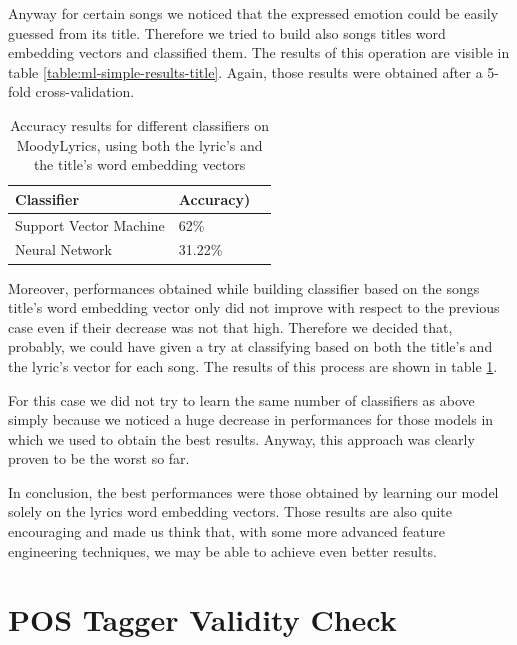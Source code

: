 Anyway for certain songs we noticed that the expressed emotion could be easily guessed from its title. Therefore
we tried to build also songs titles word embedding vectors and classified them. The results of this operation are 
visible in table \ref{table:ml-simple-results-title}. Again, those results were obtained after a 5-fold cross-validation. 

\begin{table}[]
\centering
\begin{tabular}{@{}lll@{}}
\toprule
\textbf{Classifier} & \textbf{Accuracy})   \\ \midrule
Support Vector Machine & 62\%  \\
Neural Network & 31.22\%  \\
\end{tabular}
\caption{Accuracy results for different classifiers on MoodyLyrics, using both the lyric's and the title's word embedding vectors}
\label{table:ml-simple-results-both}
\end{table}

Moreover, performances obtained while building classifier based on the songs title's word embedding vector only
did not improve with respect to the previous case even if their decrease was not that high. Therefore we decided
that, probably, we could have given a try at classifying based on both the title's and the lyric's vector for each
song. The results of this process are shown in table \ref{table:ml-simple-results-both}.

For this case we did not try to learn the same number of classifiers as above simply because we noticed a huge decrease
in performances for those models in which we used to obtain the best results. Anyway, this approach was clearly proven to be
the worst so far.

In conclusion, the best performances were those obtained by learning our model solely on the lyrics word embedding vectors.
Those results are also quite encouraging and made us think that, with some more advanced feature engineering techniques,
we may be able to achieve even better results.

\section{POS Tagger Validity Check} 

